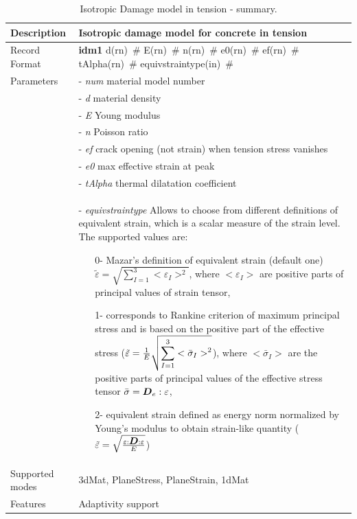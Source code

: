 \documentclass[epsf,a4paper]{article}
\newcommand{\mbf}[1]{\mbox{\boldmath$#1$}}
\newcommand{\descitem}[1]{{\noindent \bf #1}}
\newcommand{\elemparam}[2]{{{#1\tiny (#2)}~\#}}
\newcommand{\param}[1]{{\it #1}}
\begin{document}
\begin{table}[h]                                                                
\begin{tabular}{|l|p{9cm}|}                                                      
\hline                                                                          
Description & Isotropic damage model  for concrete in tension\\
\hline                                                                          
Record Format & \descitem{idm1} \elemparam{d}{rn} \elemparam{E}{rn}
\elemparam{n}{rn}  \elemparam{e0}{rn}
\elemparam{ef}{rn} \elemparam{tAlpha}{rn} \elemparam{equivstraintype}{in}\\
Parameters &- \param{num} material model number\\
&- \param{d} material density\\
&- \param{E} Young modulus\\
&- \param{n} Poisson ratio\\
&- \param{ef} crack opening (not strain) when tension stress vanishes\\
&- \param{e0} max effective strain at peak\\
&- \param{tAlpha} thermal dilatation coefficient\\
&- \param{equivstraintype} Allows to choose from different definitions
of equivalent strain, which is a scalar measure of the strain
level. The supported values are: 
\begin{itemize}
\item[0-] Mazar's definition of equivalent
strain (default one)
$\tilde\varepsilon=\sqrt{\displaystyle{\sum_{I=1}^{3}}<\varepsilon_I>^2}$,
where $<\varepsilon_I>$ are positive parts of principal values of
strain tensor,
\item[1-] corresponds to Rankine criterion of maximum principal stress and is based on
the positive part of the  effective stress
($\tilde\varepsilon={{1}\over{E}}\sqrt{\displaystyle{\sum_{I=1}^{3}}<\bar\sigma_I>^2}$), where
$<\bar\sigma_I>$ are the positive parts of principal values of the
effective stress tensor $\bar\sigma = \mbf{D}_e:\varepsilon$, 
\item[2-] equivalent
strain defined as energy norm normalized by Young's modulus to obtain
strain-like quantity
($\tilde\varepsilon=\sqrt{{\varepsilon:\mbf{D}:\varepsilon}\over{E}}$)
\end{itemize}\\
Supported modes& 3dMat, PlaneStress, PlaneStrain, 1dMat\\
Features & Adaptivity support\\
\hline
\end{tabular}                                                                   
\caption{Isotropic Damage model in tension - summary.}                
\label{id_table}                                                         
\end{table}                                                                     
\end{document}
